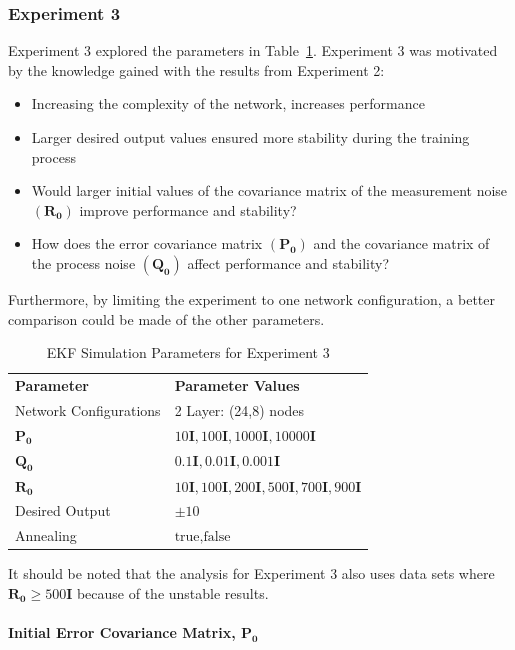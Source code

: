 \documentclass[11pt,letterpaper,titlepage]{article}
\numberwithin{equation}{section}
\numberwithin{figure}{section}
\numberwithin{table}{section}
\begin{document}
\subsubsection{Experiment 3}
Experiment 3 explored the parameters in Table~\ref{table:ekf_parameters_exp_3}. Experiment 3 was motivated by the knowledge gained with the results from Experiment 2:
\begin{itemize}
\item Increasing the complexity of the network, increases performance
\item Larger desired output values ensured more stability during the training process
\item Would larger initial values of the covariance matrix of the measurement noise \(\left(\mathbf{R_0}\right)\) improve performance and stability?
\item How does the error covariance matrix \(\left(\mathbf{P_0}\right)\) and the covariance matrix of the process noise \(\left(\mathbf{Q_0}\right)\) affect performance and stability?
\end{itemize}
Furthermore, by limiting the experiment to one network configuration, a better comparison could be made of the other parameters.

\begin{table}[ht]
  	\centering
  	\begin{tabular}{ l l }
		\rowcolor[gray]{0.8}
		\textbf{Parameter} & \textbf{Parameter Values} \\
		Network Configurations & 2 Layer: (24,8) nodes \\
  		\(\mathbf{P_0}\) & \( 10\mathbf{I}, 100\mathbf{I}, 1000\mathbf{I}, 10000\mathbf{I} \) \\
  		\(\mathbf{Q_0}\) & \( 0.1\mathbf{I}, 0.01\mathbf{I}, 0.001\mathbf{I} \) \\
 		\(\mathbf{R_0}\) & \( 10\mathbf{I}, 100\mathbf{I}, 200\mathbf{I}, 500\mathbf{I}, 700\mathbf{I}, 900\mathbf{I}\) \\
  		Desired Output& \( \pm10 \) \\
  		Annealing& \( \text{true}, \text{false} \)
	\end{tabular}
	\caption{EKF Simulation Parameters for Experiment 3}
	\label{table:ekf_parameters_exp_3}
\end{table}

It should be noted that the analysis for Experiment 3 also uses data sets where \(\mathbf{R_0} \geq 500\mathbf{I}\) because of the unstable results.

\paragraph{Initial Error Covariance Matrix, \(\mathbf{P_0}\)}
\label{sec:p_0}
\end{document}
